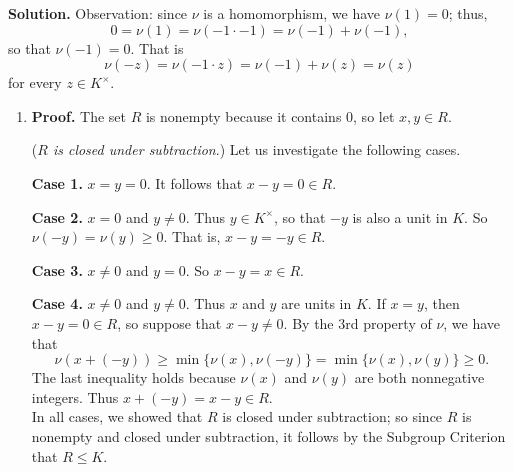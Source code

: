 \begin{enumerate}
      \textbf{Solution.} Observation: since $\nu$ is a homomorphism, we have
      $\nu(1) = 0$; thus,
      $$0 = \nu(1) = \nu(-1 \cdot -1) = \nu(-1) + \nu(-1),$$
      so that $\nu(-1) = 0$. That is
      $$\nu(-z) = \nu(-1 \cdot z) = \nu(-1) + \nu(z) = \nu(z)$$
      for every $z \in K^\times$.

      \begin{enumerate}
         \item \textbf{Proof.} The set $R$ is nonempty because it contains 0, so 
               let $x, y \in R$.

               (\textit{$R$ is closed under subtraction}.) Let us investigate 
               the following cases.

               \textbf{Case 1.} $x = y = 0$. It follows that $x - y = 0 \in R$.

               \textbf{Case 2.} $x = 0$ and $y \neq 0$. Thus $y \in K^\times$,
               so that $-y$ is also a unit in $K$. So $\nu(-y) = \nu(y) \ge 0$.
               That is, $x - y = -y \in R$.

               \textbf{Case 3.} $x \neq 0$ and $y = 0$. So $x - y = x \in R$.

               \textbf{Case 4.} $x \neq 0$ and $y \neq 0$. Thus $x$ and $y$ are
               units in $K$. If $x = y$, then $x - y = 0 \in R$, so suppose that
               $x - y \neq 0$. By the 3rd property of $\nu$, we have that
               $$\nu(x + (-y)) \ge \min\{\nu(x), \nu(-y)\} =
                 \min\{\nu(x), \nu(y)\} \ge 0.$$
               The last inequality holds because $\nu(x)$ and $\nu(y)$ are both
               nonnegative integers. Thus $x + (-y) = x - y \in R$. \\
      
               In all cases, we showed that $R$ is closed under subtraction; so 
               since $R$ is nonempty and closed under subtraction, it follows by
               the Subgroup Criterion that $R \le K$.


\end{enumerate}
\end{enumerate}
